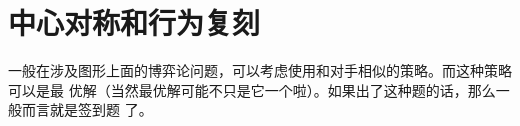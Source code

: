 \section{中心对称和行为复刻}
一般在涉及图形上面的博弈论问题，可以考虑使用和对手相似的策略。而这种策略可以是最
优解（当然最优解可能不只是它一个啦）。如果出了这种题的话，那么一般而言就是签到题
了。


